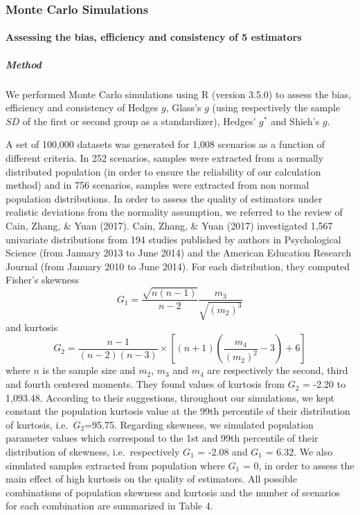\documentclass[
  12pt,
  french,
]{article}
\begin{document}
\hypertarget{monte-carlo-simulations}{%
\subsubsection{Monte Carlo Simulations}\label{monte-carlo-simulations}}

\hypertarget{assessing-the-bias-efficiency-and-consistency-of-5-estimators}{%
\paragraph{Assessing the bias, efficiency and consistency of 5
estimators}\label{assessing-the-bias-efficiency-and-consistency-of-5-estimators}}

\hypertarget{method}{%
\subparagraph{Method}\label{method}}

We performed Monte Carlo simulations using R (version 3.5.0) to assess
the bias, efficiency and consistency of Hedges \(g\), Glass's \(g\)
(using respectively the sample \(SD\) of the first or second group as a
standardizer), Hedges' \(g^*\) and Shieh's \(g\).

A set of 100,000 datasets was generated for 1,008 scenarios as a
function of different criteria. In 252 scenarios, samples were extracted
from a normally distributed population (in order to ensure the
reliability of our calculation method) and in 756 scenarios, samples
were extracted from non normal population distributions. In order to
assess the quality of estimators under realistic deviations from the
normality assumption, we referred to the review of Cain, Zhang, \& Yuan
(2017). Cain, Zhang, \& Yuan (2017) investigated 1,567 univariate
distributions from 194 studies published by authors in Psychological
Science (from January 2013 to June 2014) and the American Education
Research Journal (from January 2010 to June 2014). For each
distribution, they computed Fisher's skewness
\[G_{1}=\frac{\sqrt{n(n-1)}}{n-2} \frac{m_{3}}{\sqrt{(m_{2})^3}}\] and
kurtosis
\[G_{2}=\frac{n-1}{(n-2)(n-3)}\times \left[(n+1)\left(\frac{m_{4}}{(m_{2})^2}-3\right)+6\right]\]
where \(n\) is the sample size and \(m_{2}\), \(m_{3}\) and \(m_{4}\)
are respectively the second, third and fourth centered moments. They
found values of kurtosis from \(G_2\) = -2.20 to 1,093.48. According to
their suggestions, throughout our simulations, we kept constant the
population kurtosis value at the 99th percentile of their distribution
of kurtosis, i.e.~\(G_2\)=95.75. Regarding skewness, we simulated
population parameter values which correspond to the 1st and 99th
percentile of their distribution of skewness, i.e.~respectively \(G_1\)
= -2.08 and \(G_1\) = 6.32. We also simulated samples extracted from
population where \(G_1\) = 0, in order to assess the main effect of high
kurtosis on the quality of estimators. All possible combinations of
population skewness and kurtosis and the number of scenarios for each
combination are summarized in Table 4.
\end{document}
